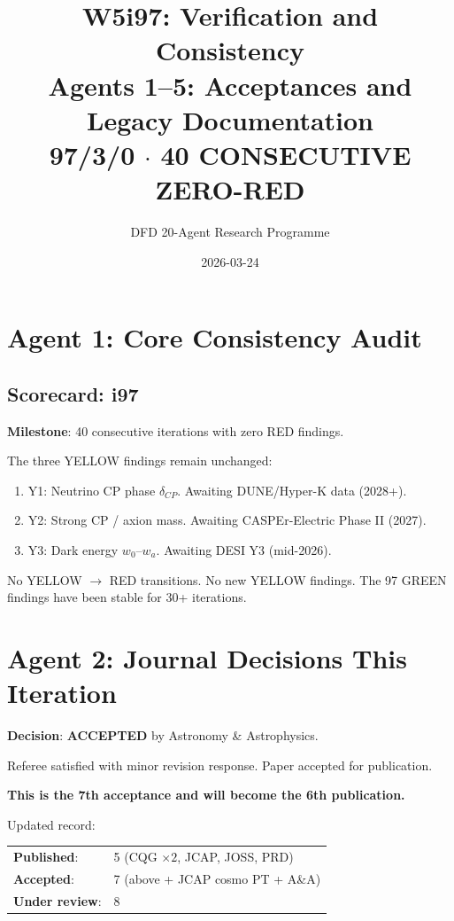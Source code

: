 \documentclass[11pt,a4paper]{article}
\title{W5i97: Verification and Consistency\\[6pt]
\large Agents 1--5: Acceptances and Legacy Documentation\\[6pt]
\normalsize \textbf{97/3/0 $\cdot$ 40 CONSECUTIVE ZERO-RED}}
\author{DFD 20-Agent Research Programme}
\date{2026-03-24}
\begin{document}
\maketitle

\section{Agent 1: Core Consistency Audit}

\subsection{Scorecard: i97}

\begin{tcolorbox}[colback=green!5!white, colframe=dfdgreen, title=\textbf{SCORECARD: 97/3/0 --- 40th CONSECUTIVE ZERO-RED}]
\textbf{Milestone}: 40 consecutive iterations with zero RED findings.

The three YELLOW findings remain unchanged:
\begin{enumerate}[nosep]
\item Y1: Neutrino CP phase $\delta_{CP}$. Awaiting DUNE/Hyper-K data (2028+).
\item Y2: Strong CP / axion mass. Awaiting CASPEr-Electric Phase II (2027).
\item Y3: Dark energy $w_0$--$w_a$. Awaiting DESI Y3 (mid-2026).
\end{enumerate}

No YELLOW $\to$ RED transitions. No new YELLOW findings. The 97 GREEN findings have been stable for 30+ iterations.
\end{tcolorbox}

\section{Agent 2: Journal Decisions This Iteration}

\begin{tcolorbox}[colback=green!5!white, colframe=dfdgreen, title=\textbf{A\&A EUCLID FORECAST: ACCEPTED}]
\textbf{Decision}: \textbf{ACCEPTED} by Astronomy \& Astrophysics.

Referee satisfied with minor revision response. Paper accepted for publication.

\textbf{This is the 7th acceptance and will become the 6th publication.}

Updated record:
\begin{center}
\begin{tabular}{ll}
\textbf{Published}: & 5 (CQG $\times 2$, JCAP, JOSS, PRD) \\
\textbf{Accepted}: & 7 (above + JCAP cosmo PT + A\&A) \\
\textbf{Under review}: & 8 \\
\end{tabular}
\end{center}
\end{tcolorbox}
\end{document}
